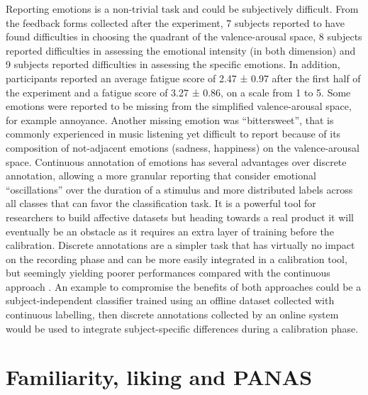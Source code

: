 Reporting emotions is a non-trivial task and could be subjectively difficult. From the feedback forms collected after the experiment, 7 subjects reported to have found difficulties in choosing the quadrant of the valence-arousal space, 8 subjects reported difficulties in assessing the emotional intensity (in both dimension) and 9 subjects reported difficulties in assessing the specific emotions. In addition, participants reported an average fatigue score of 2.47 ± 0.97 after the first half of the experiment and a fatigue score of 3.27 ± 0.86, on a scale from 1 to 5. Some emotions were reported to be missing from the simplified valence-arousal space, for example annoyance. Another missing emotion was “bittersweet”, that is commonly experienced in music listening yet difficult to report because of its composition of not-adjacent emotions (sadness, happiness) on the valence-arousal space. Continuous annotation of emotions has several advantages over discrete annotation, allowing a more granular reporting that consider emotional “oscillations” over the duration of a stimulus and more distributed labels across all classes that can favor the classification task.  It is a powerful tool for researchers to build affective datasets but heading towards a real product it will eventually be an obstacle as it requires an extra layer of training before the calibration. Discrete annotations are a simpler task that has virtually no impact on the recording phase and can be more easily integrated in a calibration tool, but seemingly yielding poorer performances compared with the continuous approach \cite{thammasan_continuous_2016}. An example to compromise the benefits of both approaches could be a subject-independent classifier trained using an offline dataset collected with continuous labelling, then discrete annotations collected by an online system would be used to integrate subject-specific differences during a calibration phase.

\section{Familiarity, liking and PANAS}

